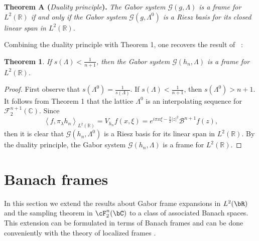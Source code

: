 \documentclass[12pt]{amsart}
\newtheorem{theorem}{Theorem}
\theoremstyle{plain}
\numberwithin{equation}{section}
\begin{document}
\textbf{Theorem A (}\emph{Duality principle}\textbf{). } \emph{The Gabor
system $\mathcal{G}(g,\Lambda )$ is a \emph{frame} for $L^{2}(%
\mathbb{R}
)$ if and only if the Gabor system $\mathcal{G}(g,\Lambda ^{0})$ is a Riesz
basis for its closed linear span in $L^{2}(%
\mathbb{R}
)$.}

\vspace{ 3mm}

Combining the duality principle with Theorem 1, one recovers the result of~%
\cite{CharlyYura}:

\begin{theorem}
If $s(\Lambda )<\frac{1}{n+1}$, then the Gabor system $\mathcal{G}%
(h_{n},\Lambda )$ is a frame for $L^{2}(%
\mathbb{R}
)$.
\end{theorem}

\begin{proof}
First observe that $s\left( \Lambda ^{0}\right) =\frac{1}{s(\Lambda )}$. If $%
s(\Lambda )<\frac{1}{n+1}$, then $s\left( \Lambda ^{0}\right) >n+1$. It
follows from Theorem 1 that the lattice $\Lambda ^{0}$ is an interpolating
sequence for $\mathcal{F}^{n+1}_2(%
\mathbb{C}
)$. Since%
\begin{equation*}
\left\langle f,\pi _{\lambda }h_{n}\right\rangle _{L^{2}(%
\mathbb{R}
)}=V_{h_{n}}f(x,\xi )=e^{i\pi x\xi -\frac{\pi }{2}\left\vert z\right\vert
^{2}}\mathcal{B}^{n+1}f(z)\text{,}
\end{equation*}%
then it is clear that $\mathcal{G}(h_{n},\Lambda ^{0})$ is a Riesz basis for
its linear span in $L^{2}(%
\mathbb{R}
)$. By the duality principle, the Gabor system $\mathcal{G}(h_{n},\Lambda )$
is a frame for $L^{2}(%
\mathbb{R}
)$.
\end{proof}

\section{Banach frames}

In this section we extend the results about Gabor frame expansions in $L^2(%
\bR )$ and the sampling theorem in $\cF ^n_2(\bC )$ to a class of associated
Banach spaces. This extension can be formulated in terms of Banach frames 
\cite{atomGroch} and can be done conveniently with the theory of localized
frames \cite{Localization_one,FoG05}.
\end{document}
